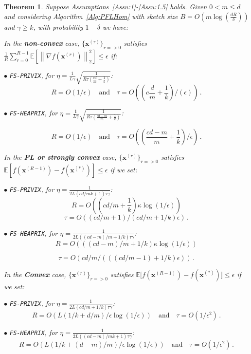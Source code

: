 \documentclass[sigconf, anonymous, review]{acmart}
\newtheorem{theorem}{Theorem}
\begin{document}
\begin{theorem}\label{thm:homog_case}
Suppose Assumptions~\ref{Assu:1}-\ref{Assu:1.5} holds. 
Given $0<m\leq d$ and considering Algorithm~\ref{Alg:PFLHom} with sketch size $B=O\left(m\log\left(\frac{d R}{\delta}\right)\right)$ and $\gamma\geq k$, with probability $1-\delta$ we have: 

\noindent In the \textbf{non-convex} case, $\{ {\boldsymbol{x}}^{(r)}\}_{r=>0}$ satisfies  $\frac{1}{R}\sum_{r=0}^{R-1}\mathbb{E}\left[\left\|\nabla f({\boldsymbol{x}}^{(r)})\right\|_2^2\right]\leq {\epsilon}$ if: 
 
\noindent $\bullet$ \texttt{FS-PRIVIX}, for $\eta=\frac{1}{L\gamma}\sqrt{\frac{1}{R\tau\left(\frac{c d}{m }+\frac{1}{k}\right)}}$: 
$$R=O\left(1/\epsilon\right) \quad \textrm{and} \quad  \tau=O\left(( c\frac{d}{m}+\frac{1}{k})/(\epsilon)\right) \, .$$

\noindent $\bullet$ \texttt{FS-HEAPRIX}, for $\eta=\frac{1}{L\gamma}\sqrt{\frac{1}{R\tau\left(\frac{cd-m}{m}+\frac{1}{k}\right)}}$: 

$$R=O\left(1/\epsilon\right)\quad \textrm{and} \quad  \tau=O\left(( \frac{c d-m}{m}+\frac{1}{k})/\epsilon\right)\, .$$

\noindent In the \textbf{PL or strongly convex} case, $\{ {\boldsymbol{x}}^{(r)}\}_{r=>0}$ satisfies $\mathbb{E}[f({\boldsymbol{x}}^{(R-1)})-f({\boldsymbol{x}}^{(*)})]\leq \epsilon$ if  we set:  

\noindent $\bullet$ \texttt{FS-PRIVIX}, for $\eta=\frac{1}{2L(cd/mk+1)\tau\gamma}$: 
$$R=O\left(\left(c d/m+\frac{1}{k}\right)\kappa\log\left(1/\epsilon\right)\right)$$ 
$$\tau=O\left((c d/m+1)\Big/\left(c d/m+1/k\right)\epsilon\right)\, .$$

\noindent $\bullet$ \texttt{FS-HEAPRIX}, for $\eta=\frac{1}{2L\left((cd-m)/m+1/k\right)\tau\gamma}$: 
$$R = O\left(\left((cd-m)/m+1/k\right)\kappa\log\left(1/\epsilon\right)\right)$$ 

$$ \tau =O\left(cd/m\Big/\left(\left((cd/m-1)+1/k\right)\epsilon\right)\right)\, .$$


In the \textbf{Convex} case, $\{ {\boldsymbol{x}}^{(r)}\}_{r=>0}$ satisfies $ \mathbb{E}\Big[f({\boldsymbol{x}}^{(R-1)})-f({\boldsymbol{x}}^{(*)})\Big]\leq \epsilon$ if we set:  


\noindent $\bullet$ \texttt{FS-PRIVIX}, for $\eta=\frac{1}{2L(cd/m+1/k)\tau\gamma}$: 
$$R =O\left(L\left(1/k+d/m\right)/\epsilon\log\left(1/\epsilon \right)\right) \quad \textrm{and} \quad  \tau=O\left(1/\epsilon^2\right)\, .$$

\noindent $\bullet$ \texttt{FS-HEAPRIX}, for $\eta=\frac{1}{2L\left((cd-m)/mk+1\right)\tau\gamma}$:   
$$R =O\left(L\left(1/k+(d-m)/m\right)/\epsilon\log\left(1/\epsilon \right)\right)\quad \textrm{and} \quad  \tau=O\left(1/\epsilon^2\right)\, .$$


\end{theorem}
\end{document}
